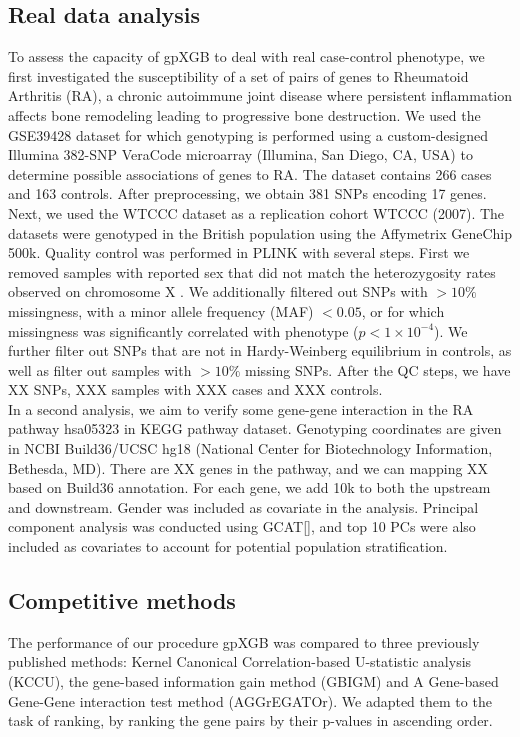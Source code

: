 \documentclass[11pt]{article}
\theoremstyle{plain}
\theoremstyle{definition}
\theoremstyle{remark}
\begin{document}
\subsection{Real data analysis}
To assess the capacity of gpXGB to deal with real case-control phenotype, we first investigated the susceptibility of a set of pairs of genes to Rheumatoid Arthritis (RA), a chronic autoimmune joint disease where persistent inflammation affects bone remodeling leading to progressive bone destruction. We used the GSE39428 dataset for which genotyping is performed using a custom-designed Illumina 382-SNP VeraCode microarray (Illumina, San Diego, CA, USA) to determine possible associations of genes to RA. The dataset contains 266 cases and 163 controls. After preprocessing, we obtain 381 SNPs encoding 17 genes. Next, we used the WTCCC dataset as a replication cohort WTCCC (2007). The datasets were genotyped in the British population using the Affymetrix GeneChip 500k. Quality control was performed in PLINK with several steps. First we removed samples with reported sex that did not 
match the heterozygosity rates observed on chromosome X \cite{12}. We additionally filtered out SNPs with $>10\%$ missingness,  with a minor allele frequency (MAF) $<0.05$, or for which missingness was significantly correlated with 
phenotype ($p<1\times 10^{-4}$). We further filter out SNPs that are not in Hardy-Weinberg equilibrium in controls, as well as filter out samples with $>10\%$ missing SNPs. After the QC steps, we have XX SNPs, XXX samples with XXX cases and XXX controls.\\

In a second analysis, we aim to verify some gene-gene interaction in the RA pathway hsa05323 in KEGG pathway dataset. Genotyping coordinates are given in NCBI Build36/UCSC hg18 (National Center for Biotechnology Information, Bethesda, MD). There are XX genes in the pathway, and we can mapping XX based on Build36 annotation. For each gene, we add 10k to both the upstream and downstream. Gender was included as covariate in the analysis. Principal component analysis was conducted using GCAT[], and top 10 PCs were also included as covariates to account for potential population stratification.\\

\subsection{Competitive methods}
The performance of our procedure gpXGB was compared to three previously published methods: Kernel Canonical Correlation-based U-statistic analysis (KCCU)\cite{4, 5}, the gene-based information gain method (GBIGM)\cite{6} and A Gene-based Gene-Gene interaction test method (AGGrEGATOr)\cite{7}. We adapted them to the task of ranking, by ranking the gene pairs by their p-values in ascending order.
\end{document}
